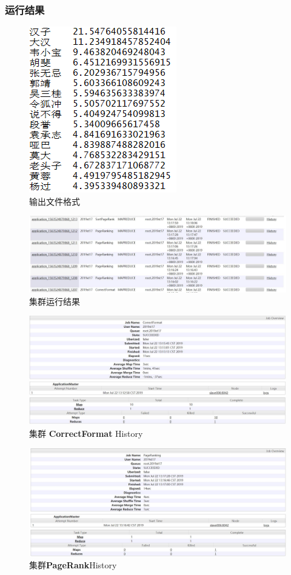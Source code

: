 \documentclass{ctexart}
\begin{document}
	\subsubsection{运行结果}
	\begin{figure}[H]
		\centering
		\includegraphics[width=0.3\linewidth]{pic/task4/Result}
		\caption{输出文件格式}
	\end{figure}
	\begin{figure}[H]
		\centering
		\includegraphics[width=0.8\linewidth]{pic/webui/task4}
		\caption{集群运行结果}
	\end{figure}
		\begin{figure}[H]
		\centering
		\includegraphics[width=0.8\linewidth]{pic/webui/task4_job1}
		\caption{集群 \textbf{CorrectFormat} History}
	\end{figure}
	\begin{figure}[H]
	\centering
	\includegraphics[width=0.8\linewidth]{pic/webui/task4_job2}
	\caption{集群\textbf{PageRank}History}
\end{figure}
\end{document}
